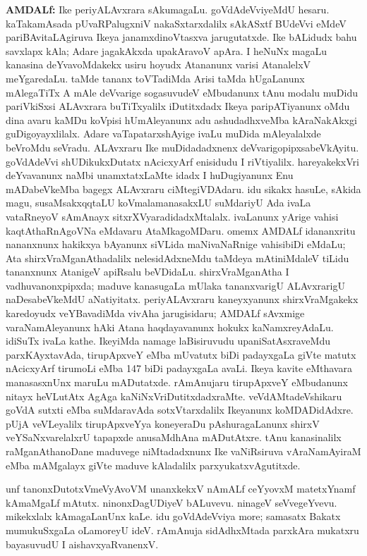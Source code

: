 {\large\textbf{AMDALf:}} Ike periyALAvxrara sAkumagaLu. goVdAdeVviyeMdU hesaru. kaTakamAsada pUvaRPalugxniV nakaSxtarxdalilx sAkASxtf BUdeVvi eMdeV pariBAvitaLAgiruva Ikeya janamxdinoVtasxva jarugutatxde. Ike bALidudx bahu savxlapx kAla; Adare jagakAkxda upakAravoV apAra. I heNuNx magaLu kanasina deYvavoMdakekx usiru hoyudx Atananunx varisi AtanalelxV meYgaredaLu. taMde tananx toVTadiMda Arisi taMda hUgaLanunx mAlegaTiTx A mAle deVvarige sogasuvudeV eMbudanunx tAnu modalu muDidu pariVkiSxsi ALAvxrara buTiTxyalilx iDutitxdadx Ikeya paripATiyanunx oMdu dina avaru kaMDu koVpisi hUmAleyanunx adu ashudadhxveMba kAraNakAkxgi guDigoyayxlilalx. Adare vaTapatarxshAyige ivaLu muDida mAleyalalxde beVroMdu seVradu. ALAvxraru Ike muDidadadxnenx deVvarigopipxsabeVkAyitu. goVdAdeVvi shUDikukxDutatx nAcicxyArf enisidudu I riVtiyalilx. hareyakekxVri deYvavanunx naMbi unamxtatxLaMte idadx I huDugiyanunx Enu mADabeVkeMba bagegx ALAvxraru ciMtegiVDAdaru. idu sikakx hasuLe, sAkida magu, susaMsakxqqtaLU koVmalamanasakxLU suMdariyU Ada ivaLa vataRneyoV sAmAnayx sitxrXVyaradidadxMtalalx. ivaLanunx yArige vahisi kaqtAthaRnAgoVNa eMdavaru AtaMkagoMDaru. omemx AMDALf idananxritu nananxnunx hakikxya bAyanunx siVLida maNivaNaRnige vahisibiDi eMdaLu; Ata shirxVraMganAthadalilx nelesidAdxneMdu taMdeya mAtiniMdaleV tiLidu tananxnunx AtanigeV apiRsalu beVDidaLu. shirxVraMganAtha I vadhuvanonxpipxda; maduve kanasugaLa mUlaka tananxvarigU ALAvxrarigU naDesabeVkeMdU aNatiyitatx. periyALAvxraru kaneyxyanunx shirxVraMgakekx karedoyudx veYBavadiMda vivAha jarugisidaru; AMDALf sAvxmige varaNamAleyanunx hAki Atana haqdayavanunx hokukx kaNamxreyAdaLu. idiSuTx ivaLa kathe. IkeyiMda namage laBisiruvudu upaniSatAsxraveMdu parxKAyxtavAda, tirupApxveY eMba mUvatutx biDi padayxgaLa giVte matutx nAcicxyArf tirumoLi eMba 147 biDi padayxgaLa avaLi. Ikeya kavite eMthavara manasasxnUnx maruLu mADutatxde. rAmAnujaru tirupApxveY eMbudanunx nitayx heVLutAtx AgAga kaNiNxVriDutitxdadxraMte. veVdAMtadeVshikaru goVdA sutxti eMba suMdaravAda sotxVtarxdalilx Ikeyanunx koMDADidAdxre. pUjA veVLeyalilx tirupApxveYya koneyeraDu pAshuragaLanunx shirxV veYSaNxvarelalxrU tapapxde anusaMdhAna mADutAtxre. tAnu kanasinalilx raMganAthanoDane maduvege niMtadadxnunx Ike vaNiRsiruva vAraNamAyiraM eMba mAMgalayx giVte maduve kAladalilx parxyukatxvAgutitxde.

unf tanonxDutotxVmeVyAvoVM unanxkekxV nAmALf ceYyovxM matetxYnamf kAmaMgaLf mAtutx. ninonxDagUDiyeV bALuvevu. ninageV seVvegeYvevu. mikekxlalx kAmagaLanUnx kaLe. idu goVdAdeVviya more; samasatx Bakatx mumukuSxgaLa oLamoreyU ideV. rAmAnuja sidAdhxMtada parxkAra mukatxru bayasuvudU I aishavxyaRvanenxV.

